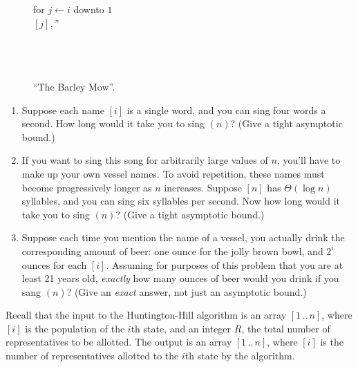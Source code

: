 \begin{exercises}
\begin{figure}[ht]
\begin{pseudocode}
\Indent for $j \gets i$ downto $1$\\
\Indent{} $[j]${\sffamily\itshape ,”}\\
\\
\\
\\
\end{pseudocode}
\caption{“The Barley Mow”.}
\label{fig:0.6}
\end{figure}
\begin{enumerate}
\item Suppose each name $[i]$ is a single word, and you can sing four words a second. How long would it take you to sing $(n)$? (Give a tight asymptotic bound.)
\item If you want to sing this song for arbitrarily large values of $n$, you’ll have to make up your own vessel names. To avoid repetition, these names must become progressively longer as $n$ increases. Suppose $[n]$ has $\Theta(\log n)$ syllables, and you can sing six syllables per second. Now how long would it take you to sing $(n)$? (Give a tight asymptotic bound.)
\item Suppose each time you mention the name of a vessel, you actually drink the corresponding amount of beer: one ounce for the jolly brown bowl, and $2^i$ ounces for each $[i]$. Assuming for purposes of this problem that you are at least 21 years old, \textit{exactly} how many ounces of beer would you drink if you sang $(n)$? (Give an \textit{exact} answer, not just an asymptotic bound.)
\end{enumerate}
\item Recall that the input to the Huntington-Hill algorithm  is an array $[1\,..\,n]$, where $[i]$ is the population of the $i$th state, and an integer $R$, the total number of representatives to be allotted. The output is an array $[1\,..\,n]$, where $[i]$ is the number of representatives allotted to the $i$th state by the algorithm.


\end{exercises}
